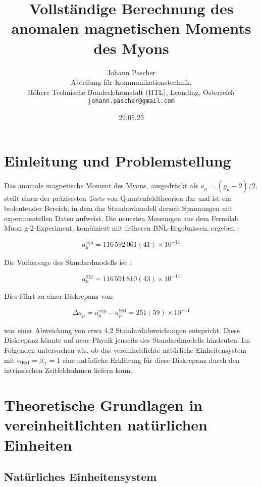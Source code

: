 \documentclass[12pt,a4paper]{article}
\title{Vollständige Berechnung des anomalen magnetischen Moments des Myons}
\author{Johann Pascher\\
	Abteilung für Kommunikationstechnik, \\Höhere Technische Bundeslehranstalt (HTL), Leonding, Österreich\\
	\texttt{johann.pascher@gmail.com}}
\date{29.05.25}
\newcommand{\alphaEM}{\alpha_{\text{EM}}}
\newcommand{\betaT}{\beta_{\text{T}}}
\begin{document}
	
	\maketitle
	
	\tableofcontents
	\newpage
	
	\section{Einleitung und Problemstellung}
	
	Das anomale magnetische Moment des Myons, ausgedrückt als $a_\mu = (g_\mu-2)/2$, stellt einen der präzisesten Tests von Quantenfeldtheorien dar und ist ein bedeutender Bereich, in dem das Standardmodell derzeit Spannungen mit experimentellen Daten aufweist. Die neuesten Messungen aus dem Fermilab Muon g-2-Experiment, kombiniert mit früheren BNL-Ergebnissen, ergeben \cite{Muong-2:2021ojo}:
	
	\begin{equation}
		a_\mu^{\text{exp}} = 116\,592\,061(41) \times 10^{-11}
	\end{equation}
	
	Die Vorhersage des Standardmodells ist \cite{Aoyama2020}:
	
	\begin{equation}
		a_\mu^{\text{SM}} = 116\,591\,810(43) \times 10^{-11}
	\end{equation}
	
	Dies führt zu einer Diskrepanz von:
	
	\begin{equation}
		\Delta a_\mu = a_\mu^{\text{exp}} - a_\mu^{\text{SM}} = 251(59) \times 10^{-11}
	\end{equation}
	
	was einer Abweichung von etwa 4,2 Standardabweichungen entspricht. Diese Diskrepanz könnte auf neue Physik jenseits des Standardmodells hindeuten. Im Folgenden untersuchen wir, ob das vereinheitlichte natürliche Einheitensystem mit $\alphaEM = \betaT = 1$ eine natürliche Erklärung für diese Diskrepanz durch den intrinsischen Zeitfeldrahmen liefern kann.
	
	\section{Theoretische Grundlagen in vereinheitlichten natürlichen Einheiten}
	
	\subsection{Natürliches Einheitensystem}
	\label{subsec:natural_unit_system}
	
\end{document}
